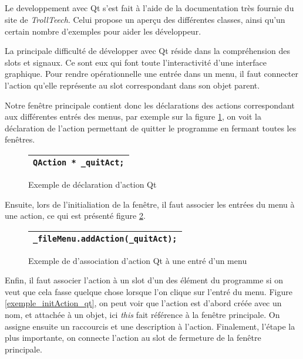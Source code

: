 \subparagraph{}
Le developpement avec Qt s'est fait \`a l'aide de la documentation tr\`es fournie du site de \textit{TrollTeech}. Celui propose un aper\c cu des diff\'erentes classes, ainsi qu'un certain nombre d'exemples pour aider les d\'eveloppeur.
\par
La principale difficult\'e de d\'evelopper avec Qt r\'eside dans la compr\'ehension des slots et signaux. Ce sont eux qui font toute l'interactivit\'e d'une interface graphique. Pour rendre op\'erationnelle une entr\'ee dans un menu, il faut connecter l'action qu'elle repr\'esente au slot correspondant dans son objet parent.
\par
Notre fen\^etre principale contient donc les d\'eclarations des actions correspondant aux diff\'erentes entr\'es des menus, par exemple sur la figure \ref{exemple_action_qt}, on voit la d\'eclaration de l'action permettant de quitter le programme en fermant toutes les fen\^etres.
\begin{figure}[H]
   \begin{center}
      \begin{tabular}{l}
         \hline
         \verb|QAction * _quitAct;|\\
         \hline
      \end{tabular}
   \end{center}
\caption{\label{exemple_action_qt} Exemple de d\'eclaration d'action Qt}
\end{figure}
Ensuite, lors de l'initialiation de la fen\^etre, il faut associer les 
entr\'ees du menu \`a une action, ce qui est pr\'esent\'e figure \ref{exemple_menu_qt}.

\begin{figure}[H]
   \begin{center}
      \begin{tabular}{l}
         \hline
         \verb|_fileMenu.addAction(_quitAct);|\\
         \hline
      \end{tabular}
   \end{center}
\caption{\label{exemple_menu_qt} Exemple de d'association d'action Qt \`a une entr\'e d'un menu}
\end{figure}

Enfin, il faut associer l'action \`a un slot d'un des \'el\'ement du programme si on veut que cela fasse quelque chose lorsque l'on clique sur l'entr\'e du menu. Figure \ref{exemple_initAction_qt}, on peut voir que l'action est d'abord cr\'e\'ee avec un nom, et attach\'ee \`a un objet, ici \textit{this} fait r\'ef\'erence \`a la fen\^etre principale. On assigne ensuite un raccourcis et une description \`a l'action. Finalement, l'\'etape la plus importante, on connecte l'action au slot de fermeture de la fen\^etre principale.

